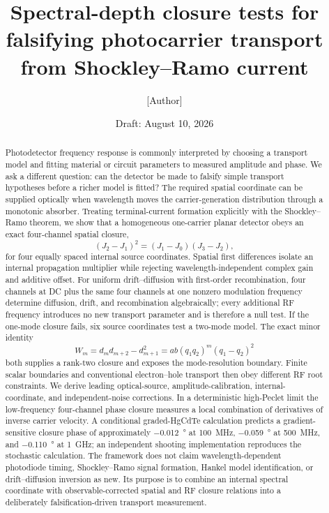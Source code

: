 \documentclass[11pt]{article}
\title{Spectral-depth closure tests for falsifying photocarrier transport from Shockley--Ramo current}
\author{[Author]}
\date{Draft: August 10, 2026}
\begin{document}
\maketitle

\begin{abstract}
Photodetector frequency response is commonly interpreted by choosing a transport model and fitting material or circuit parameters to measured amplitude and phase. We ask a different question: can the detector be made to falsify simple transport hypotheses before a richer model is fitted? The required spatial coordinate can be supplied optically when wavelength moves the carrier-generation distribution through a monotonic absorber. Treating terminal-current formation explicitly with the Shockley--Ramo theorem, we show that a homogeneous one-carrier planar detector obeys an exact four-channel spatial closure,
\begin{equation*}
(J_2-J_1)^2=(J_1-J_0)(J_3-J_2),
\end{equation*}
for four equally spaced internal source coordinates. Spatial first differences isolate an internal propagation multiplier while rejecting wavelength-independent complex gain and additive offset. For uniform drift--diffusion with first-order recombination, four channels at DC plus the same four channels at one nonzero modulation frequency determine diffusion, drift, and recombination algebraically; every additional RF frequency introduces no new transport parameter and is therefore a null test. If the one-mode closure fails, six source coordinates test a two-mode model. The exact minor identity
\begin{equation*}
W_m=d_m d_{m+2}-d_{m+1}^2
=ab(q_1q_2)^m(q_1-q_2)^2
\end{equation*}
both supplies a rank-two closure and exposes the mode-resolution boundary. Finite scalar boundaries and conventional electron--hole transport then obey different RF root constraints. We derive leading optical-source, amplitude-calibration, internal-coordinate, and independent-noise corrections. In a deterministic high-Peclet limit the low-frequency four-channel phase closure measures a local combination of derivatives of inverse carrier velocity. A conditional graded-HgCdTe calculation predicts a gradient-sensitive closure phase of approximately \SI{-0.012}{\degree} at \SI{100}{MHz}, \SI{-0.059}{\degree} at \SI{500}{MHz}, and \SI{-0.110}{\degree} at \SI{1}{GHz}; an independent shooting implementation reproduces the stochastic calculation. The framework does not claim wavelength-dependent photodiode timing, Shockley--Ramo signal formation, Hankel model identification, or drift--diffusion inversion as new. Its purpose is to combine an internal spectral coordinate with observable-corrected spatial and RF closure relations into a deliberately falsification-driven transport measurement.
\end{abstract}
\end{document}
